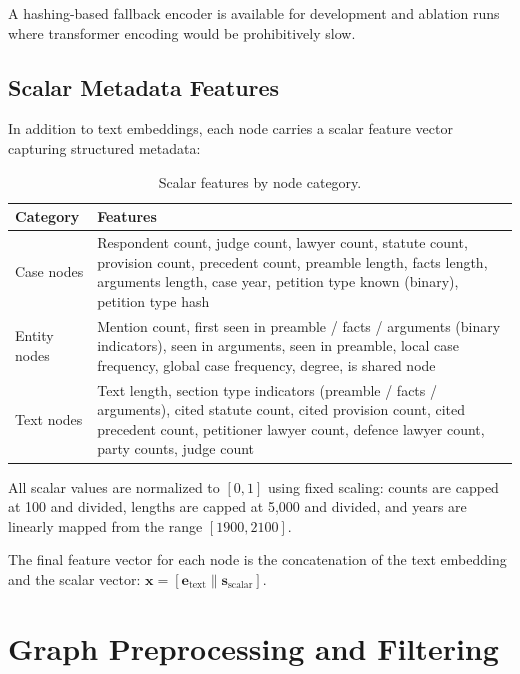 A hashing-based fallback encoder is available for development and ablation runs where transformer encoding would be prohibitively slow.

\subsection{Scalar Metadata Features}

In addition to text embeddings, each node carries a scalar feature vector capturing structured metadata:

\begin{table}[H]
\centering
\caption{Scalar features by node category.}
\label{tab:scalar-features}
\begin{tabular}{@{}lp{10cm}@{}}
\toprule
\textbf{Category} & \textbf{Features} \\
\midrule
Case nodes & Respondent count, judge count, lawyer count, statute count, provision count, precedent count, preamble length, facts length, arguments length, case year, petition type known (binary), petition type hash \\
\midrule
Entity nodes & Mention count, first seen in preamble / facts / arguments (binary indicators), seen in arguments, seen in preamble, local case frequency, global case frequency, degree, is shared node \\
\midrule
Text nodes & Text length, section type indicators (preamble / facts / arguments), cited statute count, cited provision count, cited precedent count, petitioner lawyer count, defence lawyer count, party counts, judge count \\
\bottomrule
\end{tabular}
\end{table}

All scalar values are normalized to $[0, 1]$ using fixed scaling: counts are capped at 100 and divided, lengths are capped at 5,000 and divided, and years are linearly mapped from the range $[1900, 2100]$.

The final feature vector for each node is the concatenation of the text embedding and the scalar vector: $\mathbf{x} = [\mathbf{e}_{\text{text}} \| \mathbf{s}_{\text{scalar}}]$.

\section{Graph Preprocessing and Filtering}
\label{sec:graph-preprocessing}

